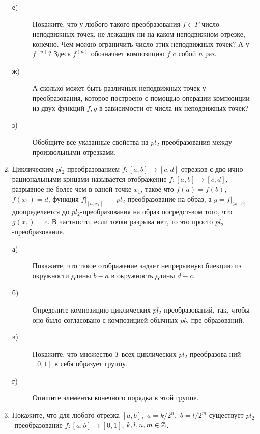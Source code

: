 \begin{enumerate}
\begin{description}
\item[е)] Покажите, что у любого такого преобразования $f\in F$ число неподвижных точек, не лежащих ни на каком неподвижном отрезке, конечно. Чем можно ограничить число этих неподвижных точек? А у $f^{(n)}$?  Здесь $f^{(n)}$ обозначает композицию $f$ c собой $n$ раз.
\item[ж)] А сколько может быть различных неподвижных точек у преобразования, которое построено с помощью операции композиции из двух функций $f,g$ в зависимости от числа их неподвижных точек?
\item[з)] Обобщите все указанные свойства на $pl_2$-преобразования между произвольными отрезками.
\end{description}

\item Циклическим $pl_2$-преобразованием $f\colon[a,b]\to [c,d]$ отрезков с дво-\linebreak ично-рациональными концами называется отображение $f\colon[a,b]\to [c,d]$, разрывное не более чем в одной точке $x_1$, такое что $f(a)=f(b)$, $f(x_1)=d$, функция $f|_{[a,x_1]}$~— $pl_2$-преобразование на образ, а $g=f|_{(x_1,b]}$~— доопределяется до $pl_2$-преобразования на образ посредст-\linebreak вом того, что $g(x_1)=c$. В частности, если точки разрыва нет, то это просто $pl_2$-преобразование.
\begin{description}
\item[а)] Покажите, что такое отображение задает непрерывную биекцию из окружности длины $b-a$ в окружность длины $d-c$.
\item[б)] Определите композицию циклических $pl_2$-преобразований, так, чтобы оно было согласовано с композицией обычных $pl_2$-пре-\linebreak образований.
\item[в)] Покажите, что множество $T$ всех циклических $pl_2$-преобразова-\linebreak ний $[0,1]$ в себя образует группу.
\item[г)] Опишите элементы конечного порядка в этой группе.
\end{description}

\item Покажите, что для любого отрезка $[a,b], \,\, a=k/2^n,\,\, b=l/2^m$ существует $pl_2$-преобразование $f\colon [a,b]\to [0,1]$, $k, l, n, m \in\mathbb{Z}$.



\end{enumerate}
